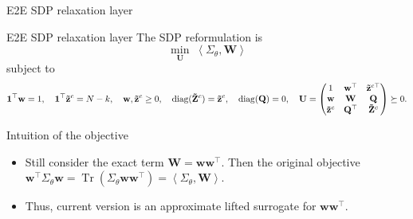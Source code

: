 \documentclass[10pt,aspectratio=169]{beamer}
\newcommand{\Nassets}{N}
\newcommand{\Kcard}{k}
\newcommand{\Param}{\theta}
\newcommand{\SigmaMat}{\Sigma}
\newcommand{\diagv}{\operatorname{diag}}
\begin{document}
\begin{frame}{E2E SDP relaxation layer}
\end{frame}

\begin{frame}{E2E SDP relaxation layer}
  \footnotesize
  The SDP reformulation is
  \[
    \min_\mathbf{U} \; \left\langle \SigmaMat_\Param, \mathbf{W} \right\rangle
  \]
  subject to
  \[
  \begin{aligned}
    \one^\top \mathbf{w} =1,\quad \one^\top \mathbf{\tilde z}^c=\Nassets-\Kcard, \quad \mathbf{w}, \mathbf{\tilde z}^c \ge 0, \quad 
    \diagv(\mathbf{\tilde Z}^c) =\mathbf{\tilde z}^c, 
    \quad
    \diagv(\mathbf{Q})=0,\quad
    \mathbf{U}  =
    \begin{pmatrix}
      1 & \mathbf{w}^\top & \mathbf{\tilde z}^{c\top}\\
      \mathbf{w} & \mathbf{W} & \mathbf{Q}\\
      \mathbf{\tilde z}^c & \mathbf{Q}^\top & \mathbf{\tilde Z}^c
    \end{pmatrix}   \succeq 0.
  \end{aligned}
  \]

  \begin{block}{\small Intuition of the objective}
    \footnotesize
    \begin{itemize}
      \item  Still consider the exact term $\mathbf{W} = \mathbf{w}\mathbf{w}^\top$. Then the original objective $\mathbf{w}^\top \SigmaMat_\Param \mathbf{w} = \operatorname{Tr}(\SigmaMat_\Param \mathbf{w}\mathbf{w}^\top) = \left\langle \SigmaMat_\Param, \mathbf{W} \right\rangle$. 
      \item Thus, current version is an approximate lifted surrogate for $\mathbf{w}\mathbf{w}^\top$.
    \end{itemize}
  \end{block}
\end{frame}
\end{document}
